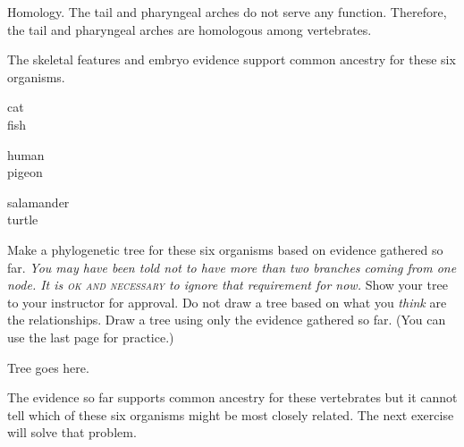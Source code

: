 \documentclass[12pt, hidelinks]{exam}
\newcommand*\AnswerBox[2]{%
    \parbox[t][#1]{0.92\textwidth}{%
    \begin{solution}#2\end{solution}}
    \vspace{\stretch{1}}
}
\begin{document}
\begin{questions}
\AnswerBox{3\baselineskip}{Homology. The tail and pharyngeal arches do not serve any function. Therefore,
the tail and pharyngeal arches are homologous among vertebrates.}

\question
The skeletal features and embryo evidence support common ancestry for these six organisms. 

\begin{multicols}{3}

	cat \\
	fish \columnbreak
	
	human \\
	pigeon \columnbreak
	
	salamander \\
	turtle 
		
\end{multicols}

Make a phylogenetic tree for these six organisms based on evidence gathered so far. \emph{You may have been told not to have more than two branches coming from one node. It is \textsc{ok and necessary} to ignore that requirement for now.} Show your tree to your instructor for approval. Do not draw a tree based on what you \emph{think} are the relationships. Draw a tree using only the evidence gathered so far. (You can use the last page for practice.)

\AnswerBox{0.45\textheight}{Tree goes here.}

\end{questions}

The evidence so far supports common ancestry for these vertebrates but it cannot tell which of these six organisms might be most closely related. The next exercise will solve that problem.
\end{document}
